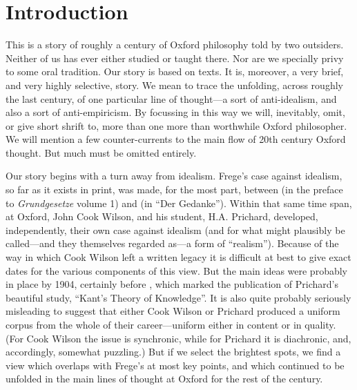 \section{Introduction} %
\label{sec:introduction}

This is a story of roughly a century of Oxford philosophy told by two outsiders. Neither of us has ever either studied or taught there. Nor are we specially privy to some oral tradition. Our story is based on texts. It is, moreover, a very brief, and very highly selective, story.  We mean to trace the unfolding, across roughly the last century, of one particular line of thought---a sort of anti-idealism, and also a sort of anti-empiricism. By focussing in this way we will, inevitably, omit, or give short shrift to, more than one more than worthwhile Oxford philosopher. We will mention a few counter-currents to the main flow of 20th century Oxford thought. But much must be omitted entirely.

Our story begins with a turn away from idealism. Frege's case against idealism, so far as it exists in print, was made, for the most part, between \citeyear{Frege:1893fv} (in the preface to \emph{Grundgesetze} volume 1) and \citeyear{Frege:1918lq} (in ``Der Gedanke''). Within that same time span, at Oxford, John Cook Wilson, and his student, H.A. Prichard, developed, independently, their own case against idealism (and for what might plausibly be called---and they themselves regarded as---a form of ``realism''). Because of the way in which Cook Wilson left a written legacy it is difficult at best to give exact dates for the various components of this view. But the main ideas were probably in place by 1904, certainly before \citeyear{Prichard:1909yg}, which marked the publication of Prichard’s beautiful study, ``Kant’s Theory of Knowledge''. It is also quite probably seriously misleading to suggest that either Cook Wilson or Prichard produced a uniform corpus from the whole of their career---uniform either in content or in quality. (For Cook Wilson the issue is synchronic, while for Prichard it is diachronic, and, accordingly, somewhat puzzling.) But if we select the brightest spots, we find a view which overlaps with Frege’s at most key points, and which continued to be unfolded in the main lines of thought at Oxford for the rest of the century.

